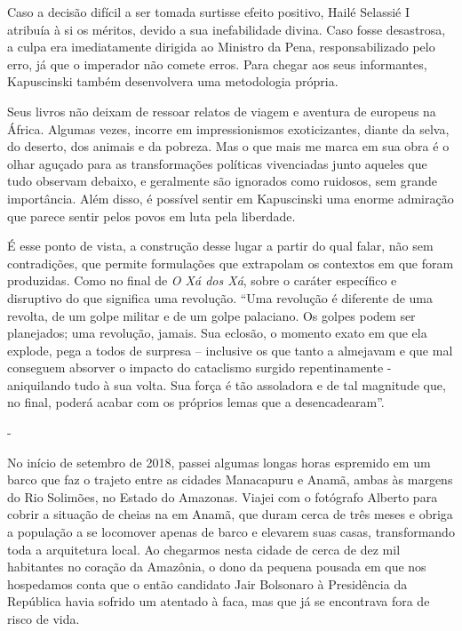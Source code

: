 Caso a decisão difícil a ser tomada surtisse efeito positivo, Hailé
Selassié I atribuía à si os méritos, devido a sua inefabilidade divina.
Caso fosse desastrosa, a culpa era imediatamente dirigida ao Ministro da
Pena, responsabilizado pelo erro, já que o imperador não comete erros.
Para chegar aos seus informantes, Kapuscinski também desenvolvera uma
metodologia própria.

Seus livros não deixam de ressoar relatos de viagem e aventura de
europeus na África. Algumas vezes, incorre em impressionismos
exoticizantes, diante da selva, do deserto, dos animais e da pobreza.
Mas o que mais me marca em sua obra é o olhar aguçado para as
transformações políticas vivenciadas junto aqueles que tudo observam
debaixo, e geralmente são ignorados como ruidosos, sem grande
importância. Além disso, é possível sentir em Kapuscinski uma enorme
admiração que parece sentir pelos povos em luta pela liberdade.

É esse ponto de vista, a construção desse lugar a partir do qual falar,
não sem contradições, que permite formulações que extrapolam os
contextos em que foram produzidas. Como no final de \emph{O Xá dos Xá},
sobre o caráter específico e disruptivo do que significa uma revolução.
``Uma revolução é diferente de uma revolta, de um golpe militar e de um
golpe palaciano. Os golpes podem ser planejados; uma revolução, jamais.
Sua eclosão, o momento exato em que ela explode, pega a todos de
surpresa -- inclusive os que tanto a almejavam e que mal conseguem
absorver o impacto do cataclismo surgido repentinamente - aniquilando
tudo à sua volta. Sua força é tão assoladora e de tal magnitude que, no
final, poderá acabar com os próprios lemas que a desencadearam''.

-

No início de setembro de 2018, passei algumas longas horas espremido em
um barco que faz o trajeto entre as cidades Manacapuru e Anamã, ambas às
margens do Rio Solimões, no Estado do Amazonas. Viajei com o fotógrafo
Alberto para cobrir a situação de cheias na em Anamã, que duram cerca de
três meses e obriga a população a se locomover apenas de barco e
elevarem suas casas, transformando toda a arquitetura local. Ao
chegarmos nesta cidade de cerca de dez mil habitantes no coração da
Amazônia, o dono da pequena pousada em que nos hospedamos conta que o
então candidato Jair Bolsonaro à Presidência da República havia sofrido
um atentado à faca, mas que já se encontrava fora de risco de vida.

